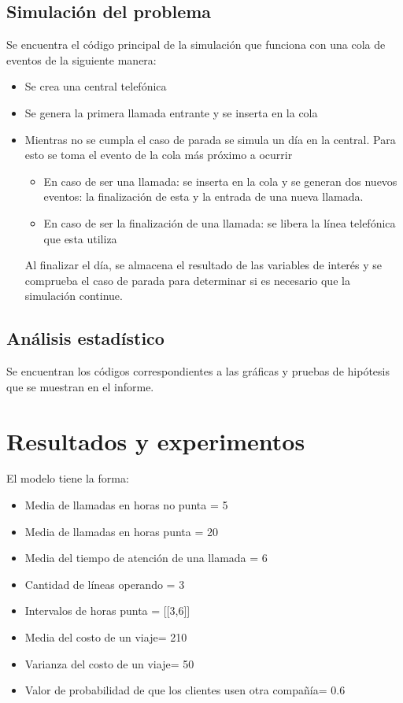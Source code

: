 \documentclass{article}
\begin{document}
	\subsection*{Simulación del problema}
	Se encuentra el código principal de la simulación que funciona con una cola de eventos de la siguiente manera:
	\begin{itemize}[left=2em]
		\item Se crea una central telefónica
		\item Se genera la primera llamada entrante y se inserta en la cola
		\item Mientras no se cumpla el caso de parada se simula un día en la central. Para esto se toma el evento de la cola más próximo a ocurrir 
		\begin{itemize}
			\item En caso de ser una llamada: se inserta en la cola y se generan dos nuevos eventos: la finalización de esta y la entrada de una nueva llamada.
			\item En caso de ser la finalización de una llamada: se libera la línea telefónica que esta utiliza
		\end{itemize}
		Al finalizar el día, se almacena el resultado de las variables de interés y se comprueba el caso de parada para determinar si es necesario que la simulación continue.
	\end{itemize}
	
	\subsection*{Análisis estadístico}
	Se encuentran los códigos correspondientes a las gráficas y pruebas de hipótesis que se muestran en el informe.

	
	\section*{Resultados y experimentos}
		El modelo tiene la forma:
		\begin{itemize}[left=2em]
			\item Media de llamadas en horas no punta = 5
			\item Media de llamadas en horas punta = 20
			\item Media del tiempo de atención de una llamada = 6
			\item Cantidad de líneas operando = 3
			\item Intervalos de horas punta = [[3,6]]
			\item Media del costo de un viaje= 210
			\item Varianza del costo de un viaje= 50
			\item Valor de probabilidad de que los clientes usen otra compañía= 0.6
	   \end{itemize}
	
\end{document}
